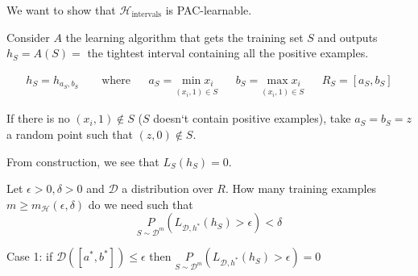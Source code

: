 \documentclass{article}
\newcommand{\<}{\langle}
\renewcommand{\>}{\rangle}
\theoremstyle{definition}
\def\gD{{\mathcal{D}}}
\def\gH{{\mathcal{H}}}
\newcommand{\uset}{\underset}
\newcommand{\uset}{\underset}
\begin{document}
\begin{figure}[h]
\centering
{}
\end{figure}

We want to show that $\gH_\text{intervals}$ is PAC-learnable.

Consider $A$ the learning algorithm that gets the training set $S$ and outputs $h_S = A(S) = $ the tightest
interval containing all the positive examples.

\begin{align*}
  h_S = h_{a_S, b_S} \qquad \text{where} &&
  a_S = \uset{(x_i, 1) \in S}{\min x_i} &&
  b_S = \uset{(x_i, 1) \in S}{\max x_i} &&
  R_S = [a_S, b_S]
\end{align*}

If there is no $(x_i, 1) \notin S$ ($S$ doesn`t contain positive examples), take %
$a_S = b_S = z$ a random point such that $(z, 0) \notin S$.

From construction, we see that $L_S(h_S) = 0$.

Let $\epsilon > 0, \delta > 0$ and $\gD$ a distribution over $R$.
How many training examples $m \geq m_{\gH}(\epsilon, \delta)$ do we need such that
\begin{equation*}
  \uset{S \sim \gD^m}{P}(L_{\gD, h^*}(h_S) > \epsilon) < \delta
\end{equation*}

Case 1: if $\gD([a^*, b^*]) \leq \epsilon$ then
  $\uset{S \sim \gD^m}{P}(L_{\gD, h^*}(h_S) > \epsilon) = 0$ \checkmark
\end{document}
